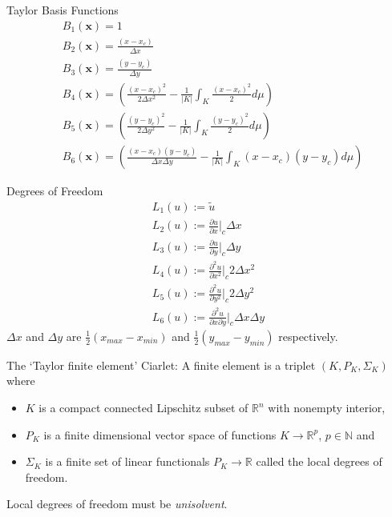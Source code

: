 \documentclass[11pt]{beamer}
\let\bld\boldsymbol
\begin{document}
\begin{frame}{Taylor Basis Functions}
\begin{align}
&B_1(\bld{x}) = 1 \\
&B_2(\bld{x}) = \frac{(x-x_c)}{\Delta x} \\
&B_3(\bld{x}) = \frac{(y-y_c)}{\Delta y} \\
&B_4(\bld{x}) = \left( \frac{(x-x_c)^2}{2\Delta x^2} - \frac{1}{|K|}\int_K \frac{(x-x_c)^2}{2}d\mu \right) \\
&B_5(\bld{x}) = \left( \frac{(y-y_c)^2}{2\Delta y^2} -\frac{1}{|K|}\int_K \frac{(y-y_c)^2}{2}d\mu \right) \\
&B_6(\bld{x}) = \left( \frac{(x-x_c)(y-y_c)}{\Delta x\Delta y} - \frac{1}{|K|}\int_K (x-x_c)(y-y_c)d\mu \right)
\end{align}
\end{frame}
\begin{frame}{Degrees of Freedom}
\begin{align}
L_1(u) := \tilde{u} \\
L_2(u) := \frac{\partial u}{\partial x}\Big|_c \Delta x \\
L_3(u) := \frac{\partial u}{\partial y}\Big|_c \Delta y \\
L_4(u) := \frac{\partial^2 u}{\partial x^2}\Big|_c 2\Delta x^2 \\
L_5(u) := \frac{\partial^2 u}{\partial y^2}\Big|_c 2\Delta y^2 \\
L_6(u) := \frac{\partial^2 u}{\partial x\partial y}\Big|_c \Delta x\Delta y
\end{align}
$\Delta x$ and $\Delta y$ are $\frac12 (x_{max}-x_{min})$ and $\frac12 (y_{max}-y_{min})$ respectively.
\end{frame}

\begin{frame}{The `Taylor finite element'}
Ciarlet: A finite element is a triplet $(K, P_K, \Sigma_K)$ where 
\begin{itemize}
\item $K$ is a compact connected Lipschitz subset of $\mathbb{R}^n$ with nonempty interior, 
\item $P_K$ is a finite dimensional vector space of functions $K \rightarrow \mathbb{R}^p$, $p \in \mathbb{N}$ and 
\item $\Sigma_K$ is a finite set of linear functionals $P_K \rightarrow \mathbb{R}$ called the local degrees of freedom.
\end{itemize}

Local degrees of freedom must be \emph{unisolvent}.
\end{frame}
\end{document}
